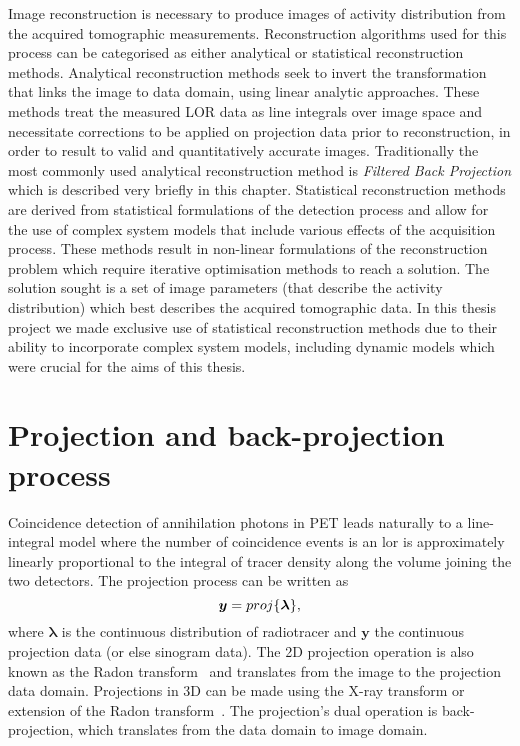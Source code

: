 Image reconstruction is necessary to produce images of activity distribution from the acquired tomographic measurements. Reconstruction algorithms used for this process can be categorised as either analytical or statistical reconstruction methods.  
Analytical reconstruction methods seek to invert the transformation that links the image to data domain, using linear analytic approaches. These methods treat the measured LOR data as line integrals over image space and necessitate corrections to be applied on projection data prior to reconstruction, in order to result to valid and quantitatively accurate images. Traditionally the most commonly used analytical reconstruction method is \textit{Filtered Back Projection} which is described very briefly in this chapter. 
Statistical reconstruction methods are derived from statistical formulations of the detection process and allow for the use of complex system models that include various effects of the acquisition process. These methods result in non-linear formulations of the reconstruction problem which require iterative optimisation methods to reach a solution. The solution sought is a set of image parameters (that describe the activity distribution) which best describes the acquired tomographic data. 
In this thesis project we made exclusive use of statistical reconstruction methods due to their ability to incorporate complex system models, including dynamic models which were crucial for the aims of this thesis.

\section{Projection and back-projection process}
Coincidence detection of annihilation photons in PET leads naturally to a line-integral model where the number of coincidence events is an \gls{lor} is approximately linearly proportional to the integral of tracer density along the volume joining the two detectors. 
The projection process can be written as
\begin{equation}
   \bm y = proj\{\bm{\lambda}\}  \\, 
  \label{eqn:Radon}
\end{equation}
where $\bm{\lambda}$ is the continuous distribution of radiotracer and $\bm{y}$ the continuous projection data (or else sinogram data).
The 2D projection operation is also known as the Radon transform~\cite{radon1917,Radon1986} and translates from the image to the projection data domain. Projections in 3D can be made using the X-ray transform or extension of the Radon transform~\cite{Natterer1986}. 
The projection's dual operation is back-projection, which translates from the data domain to image domain.
%
